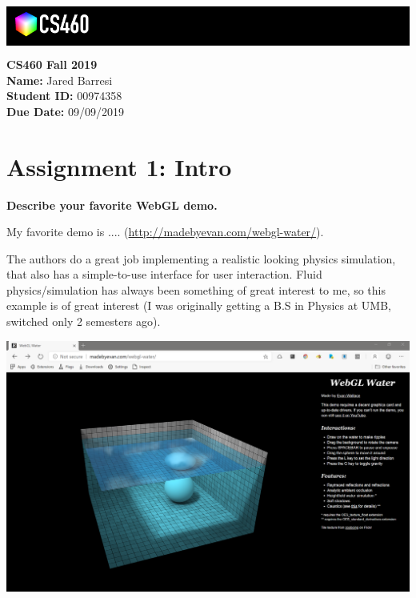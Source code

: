 \documentclass[10pt,oneside,onecolumn,letterpaper]{article}
\begin{document}
\noindent\colorbox{black}{
\begin{minipage}[c]{.99\linewidth}
  \vspace{.4cm}
  \Large{}
  \begin{flushright}
    \vspace{-1.2cm}
    \includegraphics[width=3cm]{gfx/cs460.png}
  \end{flushright}
\end{minipage}
}


\vspace{.5cm} %

\noindent\textbf{CS460 Fall 2019} \\
\textbf{Name:} Jared Barresi \\
\textbf{Student ID:} 00974358 \\
\textbf{Due Date:} 09/09/2019

\section*{Assignment 1: Intro}

\textbf{Describe your favorite WebGL demo.}

\vspace{.5cm} %

\noindent My favorite demo is .... (\url{http://madebyevan.com/webgl-water/}). 

\vspace{.5cm}

\noindent The authors do a great job implementing a realistic looking physics simulation, that also has a simple-to-use interface for user interaction. Fluid physics/simulation has always been something of great interest to me, so this example is of great interest (I was originally getting a B.S in Physics at UMB, switched only 2 semesters ago).

\vspace{.5cm} %
\noindent\includegraphics[width=\textwidth]{gfx/full-screenshot-madebyevan_webgl_water.png}
\end{document}
